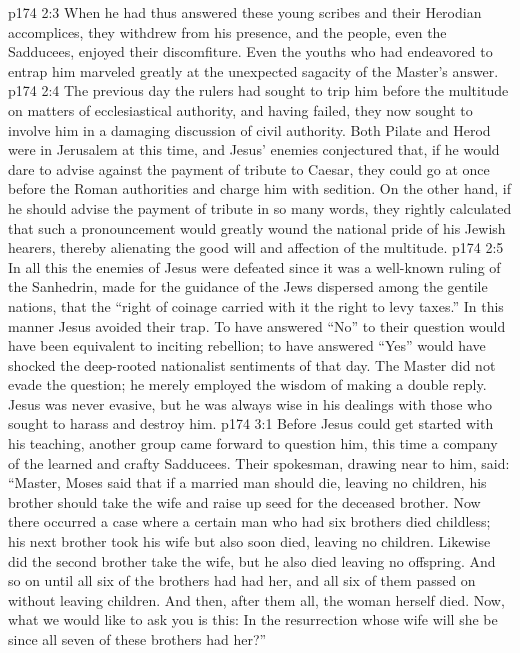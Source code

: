 \vs p174 2:3 When he had thus answered these young scribes and their Herodian accomplices, they withdrew from his presence, and the people, even the Sadducees, enjoyed their discomfiture. Even the youths who had endeavored to entrap him marveled greatly at the unexpected sagacity of the Master’s answer.
\vs p174 2:4 The previous day the rulers had sought to trip him before the multitude on matters of ecclesiastical authority, and having failed, they now sought to involve him in a damaging discussion of civil authority. Both Pilate and Herod were in Jerusalem at this time, and Jesus’ enemies conjectured that, if he would dare to advise against the payment of tribute to Caesar, they could go at once before the Roman authorities and charge him with sedition. On the other hand, if he should advise the payment of tribute in so many words, they rightly calculated that such a pronouncement would greatly wound the national pride of his Jewish hearers, thereby alienating the good will and affection of the multitude.
\vs p174 2:5 In all this the enemies of Jesus were defeated since it was a well\hyp{}known ruling of the Sanhedrin, made for the guidance of the Jews dispersed among the gentile nations, that the “right of coinage carried with it the right to levy taxes.” In this manner Jesus avoided their trap. To have answered “No” to their question would have been equivalent to inciting rebellion; to have answered “Yes” would have shocked the deep\hyp{}rooted nationalist sentiments of that day. The Master did not evade the question; he merely employed the wisdom of making a double reply. Jesus was never evasive, but he was always wise in his dealings with those who sought to harass and destroy him.
\vs p174 3:1 Before Jesus could get started with his teaching, another group came forward to question him, this time a company of the learned and crafty Sadducees. Their spokesman, drawing near to him, said: “Master, Moses said that if a married man should die, leaving no children, his brother should take the wife and raise up seed for the deceased brother. Now there occurred a case where a certain man who had six brothers died childless; his next brother took his wife but also soon died, leaving no children. Likewise did the second brother take the wife, but he also died leaving no offspring. And so on until all six of the brothers had had her, and all six of them passed on without leaving children. And then, after them all, the woman herself died. Now, what we would like to ask you is this: In the resurrection whose wife will she be since all seven of these brothers had her?”
